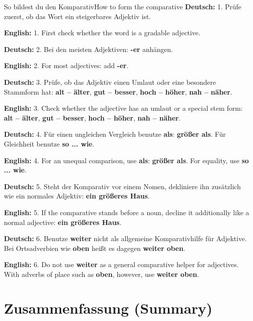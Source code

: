 \documentclass[a4paper,11pt]{article}
\newcommand{\GermanText}[1]{\textbf{Deutsch: }#1\par}
\newcommand{\EnglishText}[1]{{\small\color{SoftGray}\textbf{English: }#1\par}}
\begin{document}
      \begin{grammarentry}{So bildest du den Komparativ}{How to form the comparative}
         \GermanText{1. Prüfe zuerst, ob das Wort ein steigerbares Adjektiv ist.}
         \EnglishText{1. First check whether the word is a gradable adjective.}

         \GermanText{2. Bei den meisten Adjektiven: \textbf{-er} anhängen.}
         \EnglishText{2. For most adjectives: add \textbf{-er}.}

         \GermanText{3. Prüfe, ob das Adjektiv einen Umlaut oder eine besondere Stammform hat: \textbf{alt -- älter}, \textbf{gut -- besser}, \textbf{hoch -- höher}, \textbf{nah -- näher}.}
         \EnglishText{3. Check whether the adjective has an umlaut or a special stem form: \textbf{alt -- älter}, \textbf{gut -- besser}, \textbf{hoch -- höher}, \textbf{nah -- näher}.}

         \GermanText{4. Für einen ungleichen Vergleich benutze \textbf{als}: \textbf{größer als}. Für Gleichheit benutze \textbf{so ... wie}.}
         \EnglishText{4. For an unequal comparison, use \textbf{als}: \textbf{größer als}. For equality, use \textbf{so ... wie}.}

         \GermanText{5. Steht der Komparativ vor einem Nomen, dekliniere ihn zusätzlich wie ein normales Adjektiv: \textbf{ein größeres Haus}.}
         \EnglishText{5. If the comparative stands before a noun, decline it additionally like a normal adjective: \textbf{ein größeres Haus}.}

         \GermanText{6. Benutze \textbf{weiter} nicht als allgemeine Komparativhilfe für Adjektive. Bei Ortsadverbien wie \textbf{oben} heißt es dagegen \textbf{weiter oben}.}
         \EnglishText{6. Do not use \textbf{weiter} as a general comparative helper for adjectives. With adverbs of place such as \textbf{oben}, however, use \textbf{weiter oben}.}
      \end{grammarentry}

   \section{Zusammenfassung \textnormal{(Summary)}}
\end{document}
